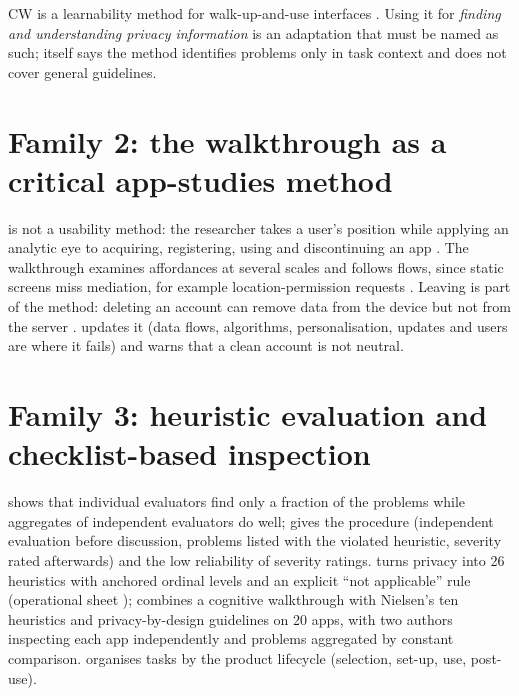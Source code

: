 CW is a learnability method for walk-up-and-use interfaces . Using it for \emph{finding and understanding privacy information} is an adaptation that must be named as such;  itself says the method identifies problems only in task context and does not cover general guidelines.

\section{Family 2: the walkthrough as a critical app-studies method}
 is not a usability method: the researcher takes a user's position while applying an analytic eye to acquiring, registering, using and discontinuing an app . The walkthrough examines affordances at several scales  and follows flows, since static screens miss mediation, for example location-permission requests . Leaving is part of the method: deleting an account can remove data from the device but not from the server .  updates it (data flows, algorithms, personalisation, updates and users are where it fails) and warns that a clean account is not neutral.

\section{Family 3: heuristic evaluation and checklist-based inspection}
 shows that individual evaluators find only a fraction of the problems while aggregates of independent evaluators do well;  gives the procedure (independent evaluation before discussion, problems listed with the violated heuristic, severity rated afterwards) and the low reliability of severity ratings.  turns privacy into 26 heuristics with anchored ordinal levels and an explicit ``not applicable'' rule (operational sheet );  combines a cognitive walkthrough with Nielsen's ten heuristics and privacy-by-design guidelines on 20 apps, with two authors inspecting each app independently and problems aggregated by constant comparison.  organises tasks by the product lifecycle (selection, set-up, use, post-use).

